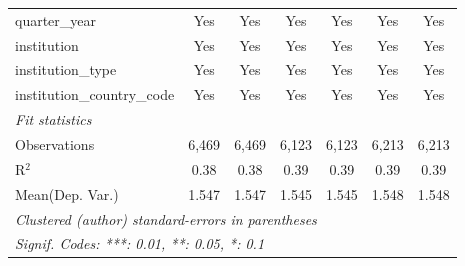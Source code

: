 \begin{tabular}{lcccccc}
   quarter\_year                      & Yes     & Yes     & Yes     & Yes     & Yes     & Yes\\  
   institution                        & Yes     & Yes     & Yes     & Yes     & Yes     & Yes\\  
   institution\_type                  & Yes     & Yes     & Yes     & Yes     & Yes     & Yes\\  
   institution\_country\_code         & Yes     & Yes     & Yes     & Yes     & Yes     & Yes\\  
   \midrule
   \emph{Fit statistics}\\
   Observations                       & 6,469   & 6,469   & 6,123   & 6,123   & 6,213   & 6,213\\  
   R$^2$                              & 0.38    & 0.38    & 0.39    & 0.39    & 0.39    & 0.39\\  
Mean(Dep. Var.) & 1.547 & 1.547 & 1.545 & 1.545 & 1.548 & 1.548 \\
   \midrule \midrule
   \multicolumn{7}{l}{\emph{Clustered (author) standard-errors in parentheses}}\\
   \multicolumn{7}{l}{\emph{Signif. Codes: ***: 0.01, **: 0.05, *: 0.1}}\\
\end{tabular}
\par\endgroup
